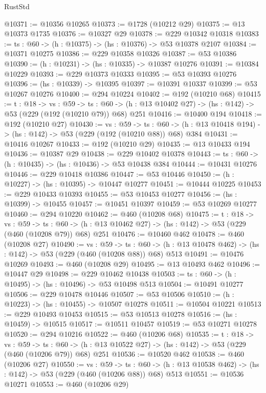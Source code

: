 \begin{lexlean}{RustStd}
\begin{coremodule}
@10371 := @10356 @10265
@10373 := @1728 (@10212 @29)
@10375 := @13 @10373 @1735
@10376 := @10327 @29
@10378 := @229 @10342 @10318
@10383 := {ts : @60} -> (h : @10375) -> (hs : @10376) -> @53 @10378 @2107
@10384 := @10371 @10275
@10386 := @229 @10358 @10326
@10387 := @53 @10386
@10390 := (h : @10231) -> (hs : @10335) -> @10387 @10276
@10391 := @10384 @10229
@10393 := @229 @10373 @10333
@10395 := @53 @10393 @10276
@10396 := (hs : @10339) -> @10395
@10397 := @10391 @10337
@10399 := @53 @10267 @10276
@10400 := @294 @10224
@10402 := @192 (@10210 @68)
@10415 := {t : @18} ->
  {vs : @59} ->
  {ts : @60} -> (h : @13 @10402 @27) -> (hs : @142) -> @53 (@229 (@192 (@10210 @79)) @68) @251
@10416 := @10400 @194
@10418 := @192 (@10210 @27)
@10430 := {vs : @59} ->
  {ts : @60} -> (h : @13 @10418 @194) -> (hs : @142) -> @53 (@229 (@192 (@10210 @88)) @68) @384
@10431 := @10416 @10267
@10433 := @192 (@10210 @29)
@10435 := @13 @10433 @194
@10436 := @10387 @29
@10438 := @229 @10402 @10378
@10443 := {ts : @60} -> (h : @10435) -> (hs : @10436) -> @53 @10438 @384
@10444 := @10431 @10276
@10446 := @229 @10418 @10386
@10447 := @53 @10446
@10450 := (h : @10227) -> (hs : @10395) -> @10447 @10277
@10451 := @10444 @10225
@10453 := @229 @10433 @10393
@10455 := @53 @10453 @10277
@10456 := (hs : @10399) -> @10455
@10457 := @10451 @10397
@10459 := @53 @10269 @10277
@10460 := @294 @10220
@10462 := @460 (@10208 @68)
@10475 := {t : @18} ->
  {vs : @59} ->
  {ts : @60} -> (h : @13 @10462 @27) -> (hs : @142) -> @53 (@229 (@460 (@10208 @79)) @68) @251
@10476 := @10460 @462
@10478 := @460 (@10208 @27)
@10490 := {vs : @59} ->
  {ts : @60} -> (h : @13 @10478 @462) -> (hs : @142) -> @53 (@229 (@460 (@10208 @88)) @68) @513
@10491 := @10476 @10269
@10493 := @460 (@10208 @29)
@10495 := @13 @10493 @462
@10496 := @10447 @29
@10498 := @229 @10462 @10438
@10503 := {ts : @60} -> (h : @10495) -> (hs : @10496) -> @53 @10498 @513
@10504 := @10491 @10277
@10506 := @229 @10478 @10446
@10507 := @53 @10506
@10510 := (h : @10223) -> (hs : @10455) -> @10507 @10278
@10511 := @10504 @10221
@10513 := @229 @10493 @10453
@10515 := @53 @10513 @10278
@10516 := (hs : @10459) -> @10515
@10517 := @10511 @10457
@10519 := @53 @10271 @10278
@10520 := @294 @10216
@10522 := @460 (@10206 @68)
@10535 := {t : @18} ->
  {vs : @59} ->
  {ts : @60} -> (h : @13 @10522 @27) -> (hs : @142) -> @53 (@229 (@460 (@10206 @79)) @68) @251
@10536 := @10520 @462
@10538 := @460 (@10206 @27)
@10550 := {vs : @59} ->
  {ts : @60} -> (h : @13 @10538 @462) -> (hs : @142) -> @53 (@229 (@460 (@10206 @88)) @68) @513
@10551 := @10536 @10271
@10553 := @460 (@10206 @29)

\end{coremodule}
\end{lexlean}
